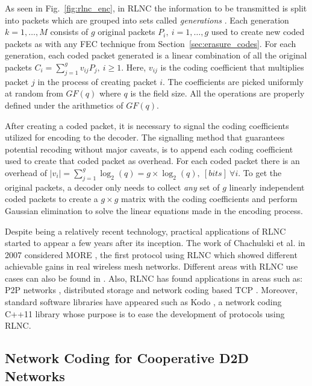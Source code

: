 As seen in Fig.~\ref{fig:rlnc_enc}, in \ac{RLNC} the information to be transmitted is split into packets which are grouped into sets called \textit{generations} \cite{chou2003practical}. Each generation $k = 1, \ldots, M$ consists of $g$ original packets $P_i,\ i = 1, \ldots, g$ used to create new coded packets as with any \ac{FEC} technique from Section~\ref{sec:erasure_codes}. For each generation, each coded packet generated is a linear combination of all the original packets $C_i = \sum_{j = 1}^g v_{ij} P_j,\ i \geq 1$. Here, $v_{ij}$ is the coding coefficient that multiplies packet $j$ in the process of creating packet $i$. The coefficients are picked uniformly at random from $GF(q)$ where $q$ is the field size. All the operations are properly defined under the arithmetics of $GF(q)$.

After creating a coded packet, it is necessary to signal the coding coefficients utilized for encoding to the decoder. The signalling method that guarantees potential recoding without major caveats, is to append each coding coefficient used to create that coded packet as overhead. For each coded packet there is an overhead of $|v_{i}| = \sum_{j = 1}^g \log_{2}(q) = g \times \log_{2}(q),\ [bits]\ \forall i$. To get the original packets, a decoder only needs to collect \textit{any} set of $g$ linearly independent coded packets to create a $g \times g$ matrix with the coding coefficients and perform Gaussian elimination \cite{fragouli2006network} to solve the linear equations made in the encoding process.

Despite being a relatively recent technology, practical applications of \ac{RLNC} started to appear a few years after its inception. The work of Chachulski et al. in 2007 considered \ac{MORE} \cite{chachulski2007more}, the first protocol using \ac{RLNC} which showed different achievable gains in real wireless mesh networks. Different areas with \ac{RLNC} use cases can also be found in \cite{fragouli2006network}. Also, \ac{RLNC} has found applications in areas such as: \ac{P2P} networks \cite{gkantsidis2005network}, distributed storage \cite{dimakis2010network} and network coding based \ac{TCP} \cite{kim2014modeling}. Moreover, standard software libraries have appeared such as Kodo \cite{kodo2011pedersen}, a network coding C++11 library whose purpose is to ease the development of protocols using \ac{RLNC}.

\subsection{Network Coding for Cooperative D2D Networks}

